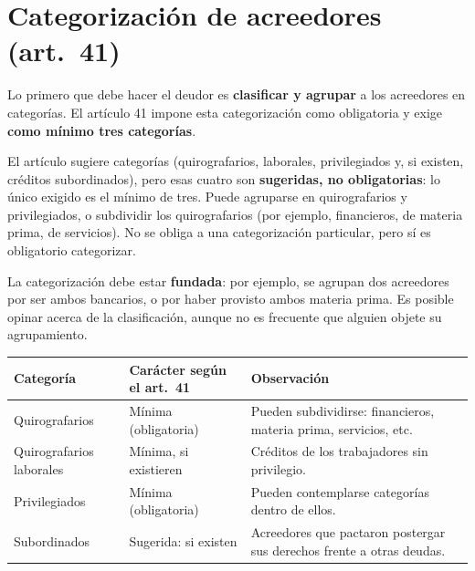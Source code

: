 \documentclass[12pt,oneside]{book}
\begin{document}
\section{Categorización de acreedores (art.\ 41)}

Lo primero que debe hacer el deudor es \textbf{clasificar y agrupar} a los acreedores en categorías. El artículo 41 impone esta categorización como obligatoria y exige \textbf{como mínimo tres categorías}.

El artículo sugiere categorías (quirografarios, laborales, privilegiados y, si existen, créditos subordinados), pero esas cuatro son \textbf{sugeridas, no obligatorias}: lo único exigido es el mínimo de tres. Puede agruparse en quirografarios y privilegiados, o subdividir los quirografarios (por ejemplo, financieros, de materia prima, de servicios). No se obliga a una categorización particular, pero sí es obligatorio categorizar.

La categorización debe estar \textbf{fundada}: por ejemplo, se agrupan dos acreedores por ser ambos bancarios, o por haber provisto ambos materia prima. Es posible opinar acerca de la clasificación, aunque no es frecuente que alguien objete su agrupamiento.

\begin{center}
\small
\begin{tabularx}{\textwidth}{P{3.2cm} P{3.6cm} Y}
\toprule
\textbf{Categoría} & \textbf{Carácter según el art.\ 41} & \textbf{Observación} \\
\midrule
Quirografarios & Mínima (obligatoria) & Pueden subdividirse: financieros, materia prima, servicios, etc. \\
Quirografarios laborales & Mínima, si existieren & Créditos de los trabajadores sin privilegio. \\
Privilegiados & Mínima (obligatoria) & Pueden contemplarse categorías dentro de ellos. \\
Subordinados & Sugerida: si existen & Acreedores que pactaron postergar sus derechos frente a otras deudas. \\
\bottomrule
\end{tabularx}
\end{center}
\end{document}
